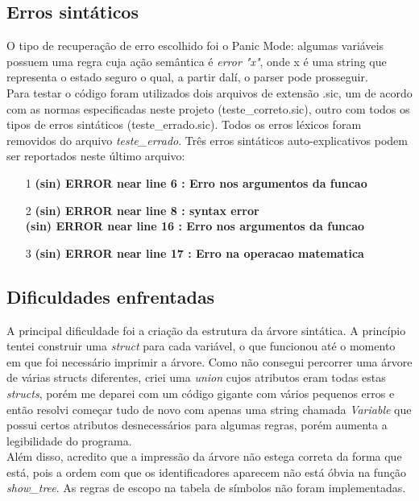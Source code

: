 \documentclass[12pt]{article}
\begin{document}
\subsection{Erros sintáticos}

\indent O tipo de recuperação de erro escolhido foi o Panic Mode: algumas variáveis possuem uma regra cuja ação semântica é \textit{error "x"}, onde x é uma string que representa o estado seguro o qual, a partir dalí, o parser pode prosseguir. \\
\indent Para testar o código foram utilizados dois arquivos de extensão .sic, um de acordo com as normas especificadas neste projeto (teste\_correto.sic), outro com todos os tipos de erros sintáticos (teste\_errado.sic). Todos os erros léxicos foram removidos do arquivo \textit{teste\_errado}. Três erros sintáticos auto-explicativos podem ser reportados neste último arquivo:
\begin{itemize}
  \item[1] \textbf{(sin) ERROR near line 6 : Erro nos argumentos da funcao}
  \item[2] \textbf{(sin) ERROR near line 8 : syntax error} \\
	\textbf{(sin) ERROR near line 16 : Erro nos argumentos da funcao}
  \item[3] \textbf{(sin) ERROR near line 17 : Erro na operacao matematica}
\end{itemize}

\subsection{Dificuldades enfrentadas}

\indent A principal dificuldade foi a criação da estrutura da árvore sintática. A princípio tentei construir uma \textit{struct} para cada variável, o que funcionou até o momento em que  foi necessário imprimir a árvore. Como não consegui percorrer uma árvore de várias structs diferentes, criei uma \textit{union} cujos atributos eram todas estas \textit{structs}, porém me deparei com um código gigante com vários pequenos erros e então resolvi começar tudo de novo com apenas uma string chamada \textit{Variable} que possui certos atributos desnecessários para algumas regras, porém aumenta a legibilidade do programa. \\
\indent Além disso, acredito que a impressão da árvore não estega correta da forma que está, pois a ordem com que os identificadores aparecem não está óbvia na função \textit{show\_tree}. As regras de escopo na tabela de símbolos não foram implementadas.
\end{document}
